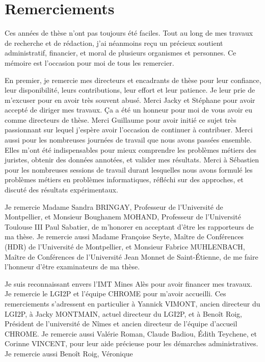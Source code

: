 \chapter*{Remerciements}
\label{sec:acknowledgement}
\begin{flushright}

\end{flushright}
Ces années de thèse n'ont pas  toujours été faciles. Tout au long de mes travaux de recherche et de rédaction, j'ai néanmoins reçu un précieux soutient administratif, financier, et moral de plusieurs organismes et personnes. Ce mémoire est l'occasion pour moi de tous les remercier.

En premier, je remercie mes directeurs et encadrants de thèse pour leur confiance, leur disponibilité, leurs contributions, leur effort et leur patience. Je leur prie de m'excuser pour en avoir  très souvent abusé. Merci Jacky et Stéphane pour avoir accepté de diriger mes travaux. Ça a été un honneur pour moi de vous avoir eu comme directeurs de thèse. Merci Guillaume pour avoir initié ce sujet très passionnant sur lequel j'espère avoir l'occasion de continuer à contribuer. Merci aussi pour les nombreuses journées de travail que nous avons passées ensemble. Elles m'ont été indispensables pour mieux comprendre les problèmes métiers des juristes, obtenir des données annotées, et valider mes résultats. Merci à Sébastien pour les nombreuses sessions de travail durant lesquelles nous avons formulé les problèmes métiers en problèmes informatiques, réfléchi sur des approches, et discuté des résultats expérimentaux. 

Je remercie Madame Sandra BRINGAY, Professeur de l'Université de Montpellier, et 
Monsieur Boughanem MOHAND, Professeur de l'Université Toulouse III Paul Sabatier, de m'honorer en acceptant d'être les rapporteurs de ma thèse. Je remercie aussi Madame Françoise Seyte, Maître de Conférences (HDR) de l'Université de Montpellier, et  Monsieur Fabrice MUHLENBACH, Maître de Conférences de l'Université Jean Monnet de Saint-Étienne, de me faire l'honneur d'être examinateurs de ma thèse.

Je suis reconnaissant envers l'IMT Mines Alès pour avoir financer mes travaux. Je remercie le LGI2P et l'équipe CHROME pour m'avoir accueilli. Ces remerciements s'adressent en particulier à Yannick VIMONT, ancien directeur du LGI2P, à Jacky MONTMAIN, actuel directeur du LGI2P, et à Benoît Roig, Président de l'université de Nîmes et ancien directeur de l'équipe d'accueil CHROME. Je remercie aussi Valérie Roman, Claude Badiou, Édith  Teychene, et Corinne VINCENT, pour leur aide précieuse pour les démarches administratives. Je remercie aussi Benoît Roig, Véronique 

